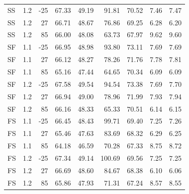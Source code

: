 \documentclass[10pt,journal]{IEEEtran}
\begin{document}
\begin{center}
\begin{tabular}{@{}lrrrrrrrr@{}}
SS & 1.2 & -25 & 67.33 & 49.19 & 91.81 & 70.52 & 7.46 & 7.47 \\
SS & 1.2 & 27 & 66.71 & 48.67 & 76.86 & 69.25 & 6.28 & 6.20 \\
SS & 1.2 & 85 & 66.00 & 48.08 & 63.73 & 67.97 & 9.62 & 9.60 \\
SF & 1.1 & -25 & 66.95 & 48.98 & 93.80 & 73.11 & 7.69 & 7.69 \\
SF & 1.1 & 27 & 66.12 & 48.27 & 78.26 & 71.76 & 7.78 & 7.81 \\
SF & 1.1 & 85 & 65.16 & 47.44 & 64.65 & 70.34 & 6.09 & 6.09 \\
SF & 1.2 & -25 & 67.58 & 49.54 & 94.54 & 73.38 & 7.69 & 7.70 \\
SF & 1.2 & 27 & 66.94 & 49.00 & 78.96 & 71.99 & 7.93 & 7.94 \\
SF & 1.2 & 85 & 66.16 & 48.33 & 65.33 & 70.51 & 6.14 & 6.15 \\
FS & 1.1 & -25 & 66.45 & 48.43 & 99.71 & 69.40 & 7.25 & 7.26 \\
FS & 1.1 & 27 & 65.46 & 47.63 & 83.69 & 68.32 & 6.29 & 6.25 \\
FS & 1.1 & 85 & 64.18 & 46.59 & 70.28 & 67.33 & 8.75 & 8.72 \\
FS & 1.2 & -25 & 67.34 & 49.14 & 100.69 & 69.56 & 7.25 & 7.25 \\
FS & 1.2 & 27 & 66.69 & 48.60 & 84.67 & 68.38 & 6.10 & 6.06 \\
FS & 1.2 & 85 & 65.86 & 47.93 & 71.31 & 67.24 & 8.57 & 8.55 \\
\bottomrule\end{tabular}
\end{center}
\clearpage
\end{document}
